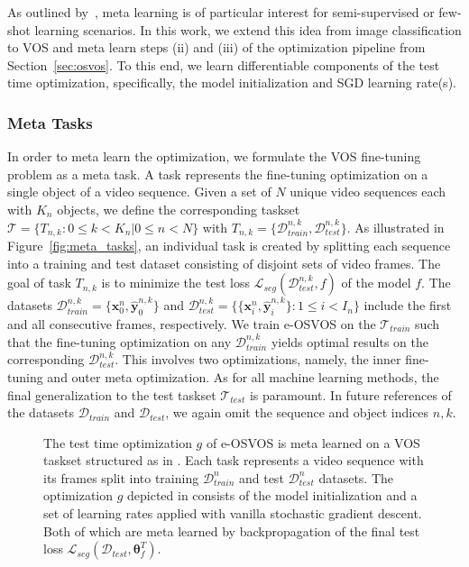 \documentclass{article}
\begin{document}
    As outlined by~\cite{Ravi2017OptimizationAA}, meta learning is of particular interest for semi-supervised or few-shot learning scenarios. In this work, we extend this idea from image classification to VOS and meta learn steps (ii) and (iii) of the optimization pipeline from Section~\ref{sec:osvos}.
To this end, we learn differentiable components of the test time optimization, specifically, the model initialization and SGD learning rate(s).


    \subsubsection{Meta Tasks}
In order to meta learn the optimization, we formulate the VOS fine-tuning problem as a meta task.
A task represents the fine-tuning optimization on a single object of a video sequence.
Given a set of $N$ unique video sequences each with $K_n$ objects, we define the corresponding taskset $\mathcal{T} = \{T_{n, k} : 0 \leq k < K_n | 0 \leq n < N \}$ with $T_{n,k} = \{\mathcal{D}_{train}^{n, k}, \mathcal{D}_{test}^{n, k} \}$.
As illustrated in Figure~\ref{fig:meta_tasks}, an individual task is created by splitting each sequence into a training and test dataset consisting of disjoint sets of video frames.
The goal of task $T_{n, k}$ is to minimize the test loss $\mathcal{L}_{seg}(\mathcal{D}_{test}^{n, k}, f)$ of the model $f$.
The datasets $\mathcal{D}_{train}^{n, k} = \{\mathbf{x}_0^n, \mathbf{\hat{y}}_0^{n, k} \}$ and $\mathcal{D}_{test}^{n, k} = \{ \{\mathbf{x}_i^n, \mathbf{\hat{y}}_i^{n, k} \} : 1 \leq i < I_n \}$ include the first and all consecutive frames, respectively.
We train e-OSVOS on the
         $\mathcal{T}_{train}$ such that the fine-tuning optimization on any $\mathcal{D}_{train}^{n, k}$ yields optimal results on the corresponding $\mathcal{D}_{test}^{n, k}$.
This involves two optimizations, namely, the inner fine-tuning and outer meta optimization.
As for all machine learning methods, the final generalization to the test taskset $\mathcal{T}_{test}$ is paramount.
In future references of the datasets $\mathcal{D}_{train}$ and $\mathcal{D}_{test}$, we again omit the sequence and object indices $n, k$.

        \begin{figure*}[ht]
    \centering
    \hspace*{-0.22cm}
\caption{The test time optimization $g$ of e-OSVOS is meta learned on a VOS taskset structured as in \protect{}.
Each task represents a video sequence with its frames split into training $\mathcal{D}_{train}^n$ and test $\mathcal{D}_{test}^n$ datasets.
The optimization $g$ depicted in \protect{} consists of the model initialization and a set of learning rates applied with vanilla stochastic gradient descent.
Both of which are meta learned by backpropagation of the final test loss $\mathcal{L}_{seg}(\mathcal{D}_{test}, \boldsymbol \theta_f^T)$.
}
\end{figure*} 
\end{document}
